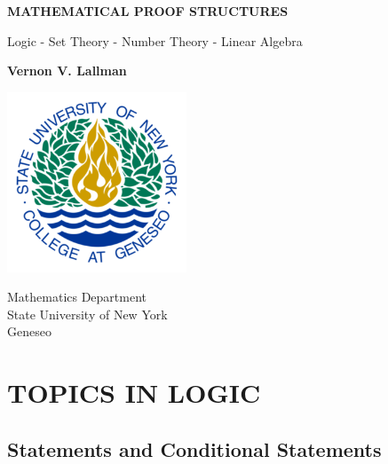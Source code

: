 \documentclass{book}
\theoremstyle{definition}
\theoremstyle{remark}
\begin{document}
\begin{titlepage}
    \begin{center}
        \vspace*{1cm}
        
        \textbf{MATHEMATICAL PROOF STRUCTURES}
        
        \vspace{0.5cm}
        Logic - Set Theory - Number Theory - Linear Algebra
        
        \vspace{1.5cm}
        
        \textbf{Vernon V. Lallman}
        
        \vfill
        
        
        \vspace{0.8cm}
        
        \includegraphics[width=0.4\textwidth]{university}
        
        Mathematics Department\\
        State University of New York \\
        Geneseo\\
        \date{\today}
        
    \end{center}
\end{titlepage}

\tableofcontents


\newpage
\chapter{TOPICS IN LOGIC}
\section{Statements and Conditional Statements}
\end{document}
